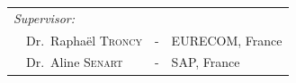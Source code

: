 {\begin{titlepage}



\begin{center}
\noindent \large
\begin{tabular}{llcl}


\textit{Supervisor:}&     & & \\
\multicolumn{2}{l}{~~Dr.\ Rapha\"el \textsc{Troncy}} & - & EURECOM, France \\
\multicolumn{2}{l}{~~Dr.\ Aline \textsc{Senart}}     & - & SAP, France \\

\end{tabular}
\end{center}

\end{titlepage}

}
